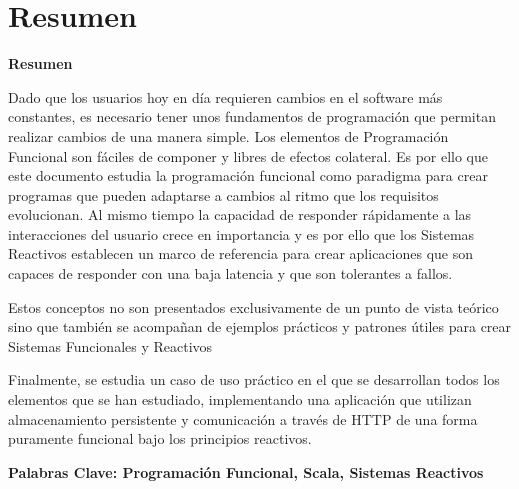 \documentclass[../main.tex]{subfiles}
\begin{document}
\makeatletter
\renewenvironment{abstract}{%
    \if@twocolumn
      \section*{Resumen \\}%
    \else %
    \begin{flushright}
        {\filleft\Huge\bfseries\fontsize{48pt}{12}\selectfont Resumen\vspace{\z@}}%
        \end{flushright}
      \quotation
    \fi}
    {\if@twocolumn\else\endquotation\fi}
\makeatother
\begin{abstract}
Dado que los usuarios hoy en día requieren cambios en el software más constantes, es necesario tener unos fundamentos de programación que permitan realizar cambios de una manera simple. Los elementos de Programación Funcional son fáciles de componer y libres de efectos colateral. Es por ello que este documento estudia la programación funcional como paradigma para crear programas que pueden adaptarse a cambios al ritmo que los requisitos evolucionan. Al mismo tiempo la capacidad de responder rápidamente a las interacciones del usuario crece en importancia y es por ello que los Sistemas Reactivos establecen un marco de referencia para crear aplicaciones que son capaces de responder con una baja latencia y que son tolerantes a fallos.

Estos conceptos no son presentados exclusivamente de un punto de vista teórico sino que también se acompañan de ejemplos prácticos y patrones útiles para crear Sistemas Funcionales y Reactivos

Finalmente, se estudia un caso de uso práctico en el que se desarrollan todos los elementos que se han estudiado, implementando una aplicación que utilizan almacenamiento persistente y comunicación a través de HTTP de una forma puramente funcional bajo los principios reactivos.

\bfseries{\large{Palabras Clave:} Programación Funcional, Scala, Sistemas Reactivos}

\end{abstract}
\end{document}
